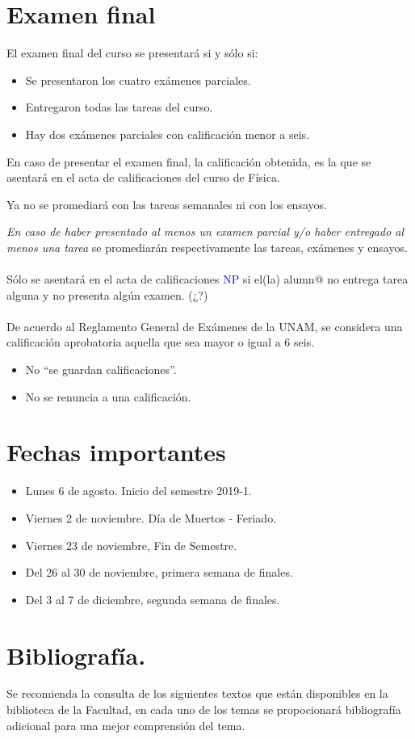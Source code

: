 \documentclass[12pt]{article}
\begin{document}
\section{Examen final}
El examen final del curso se presentará si y sólo si:
\begin{itemize}
\item Se presentaron los cuatro exámenes parciales.
\item Entregaron todas las tareas del curso.
\item Hay dos exámenes parciales con calificación menor a seis.
\end{itemize}
En caso de presentar el examen final, la calificación obtenida, es la que se asentará en el acta de calificaciones del curso de Física.
\par
Ya no se promediará con las tareas semanales ni con los ensayos.
\par
\emph{En caso de haber presentado al menos un examen parcial y/o haber entregado al menos una tarea} se promediarán respectivamente las tareas, exámenes y ensayos.
\\
\\
Sólo se asentará en el acta de calificaciones \textcolor{blue}{NP} si el(la) alumn{@} no entrega tarea alguna y no presenta algún examen. (¿?)
\\
\\
De acuerdo al Reglamento General de Exámenes de la UNAM, se considera una calificación aprobatoria aquella que sea mayor o igual a $6$ seis.
\begin{itemize}
\item No \enquote{se guardan calificaciones}.
\item No se renuncia a una calificación.
\end{itemize}
\section{Fechas importantes}
\begin{itemize}
\item Lunes 6 de agosto. Inicio del semestre 2019-1.
\item Viernes 2 de noviembre. Día de Muertos - Feriado.
\item Viernes 23 de noviembre, Fin de Semestre.
\item Del 26 al 30 de noviembre, primera semana de finales.
\item Del 3 al 7 de diciembre,  segunda semana de finales.
\end{itemize}
\newpage
\section{Bibliografía.}
Se recomienda la consulta de los siguientes textos que están disponibles en la biblioteca de la Facultad, en cada uno de los temas se propocionará bibliografía adicional para una mejor comprensión del tema.
\nocite{*}


\end{document}
